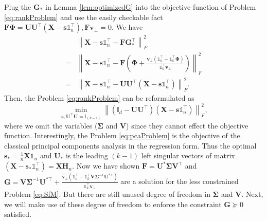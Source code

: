 \documentclass[journal]{IEEEtran}
\begin{document}
Plug the $\mathbf{G}_*$ in Lemma \ref{lem:optimizedG} into the objective function of Problem \eqref{eq:rankProblem} and use the easily checkable fact $\mathbf{F}\mathbf{\Phi} = \mathbf{U}\mathbf{U}^\top \left(\mathbf{X}-\mathbf{s}\mathbb{1}_n^\top\right), \mathbf{F}\mathbf{v}_\bot = 0$. We have
\[
\begin{aligned}
&\left\| \mathbf{X} - \mathbf{s}\mathbb{1}_n^\top- \mathbf{FG}^\top_*\right\|_F^2 \\
=& \left\| \mathbf{X} - \mathbf{s}\mathbb{1}_n^\top- \mathbf{F}\left(\mathbf{\Phi} 
+
\frac{\mathbf{v}_\bot\left(\mathbb{1}_n^\top - \mathbb{1}_k^\top \mathbf{\Phi} \right) }{\mathbb{1}_k^\top \mathbf{v}_\bot}\right) \right\|_F^2 \\
=& \left\| \mathbf{X} - \mathbf{s}\mathbb{1}_n^\top- \mathbf{U}\mathbf{U}^\top \left(\mathbf{X}-\mathbf{s}\mathbb{1}_n^\top\right) \right\|_F^2.
\end{aligned}
\]
Then, the Problem \eqref{eq:rankProblem} can be reformulated as
\begin{equation}\label{eq:pcaProblem}
\min_{\mathbf{s},\mathbf{U}^\top\mathbf{U}=\mathbb{I}_{(k-1)}} \left\| \left(\mathbb{I}_{d} - \mathbf{U}\mathbf{U}^\top\right)\left( \mathbf{X} - \mathbf{s}\mathbb{1}_n^\top \right) \right\|_F^2,
\end{equation}
where we omit the variables ($\mathbf{\Sigma}$ and $\mathbf{V}$) since they cannot effect the objective function.
Interestingly, the Problem \eqref{eq:pcaProblem} is the objective of the classical principal components analysis in the regression form. Thus the optimal $\mathbf{s}_* = \frac{1}{n}\mathbf{X}\mathbb{1}_n$ and $\mathbf{U}_*$ is the leading $(k-1)$ left singular vectors of matrix $\left(\mathbf{X} - \mathbf{s}_*\mathbb{1}_n^\top\right) = \mathbf{X}\mathbf{H}_n$. 
Now we have shown $\mathbf{F}=\mathbf{U}^*\mathbf{\Sigma}\mathbf{V}^\top$ and $\mathbf{G}=\mathbf{V}\mathbf{\Sigma}^{-1}\mathbf{U}^{*\top }
+
\frac{\mathbf{v}_\bot\left(\mathbb{1}_n^\top - \mathbb{1}_k^\top \mathbf{V}\mathbf{\Sigma}^{-1}\mathbf{U}^{*\top } \right) }{\mathbb{1}_k^\top\mathbf{v}_\bot }$ are a solution for the less constrained Problem \eqref{eq:SfM}.
But there are still unused degree of freedom in $\mathbf{\Sigma}$ and $\mathbf{V}$. Next, we will make use of these degree of freedom to enforce the constraint $\mathbf{G}\succeq 0$ satisfied.
\end{document}
